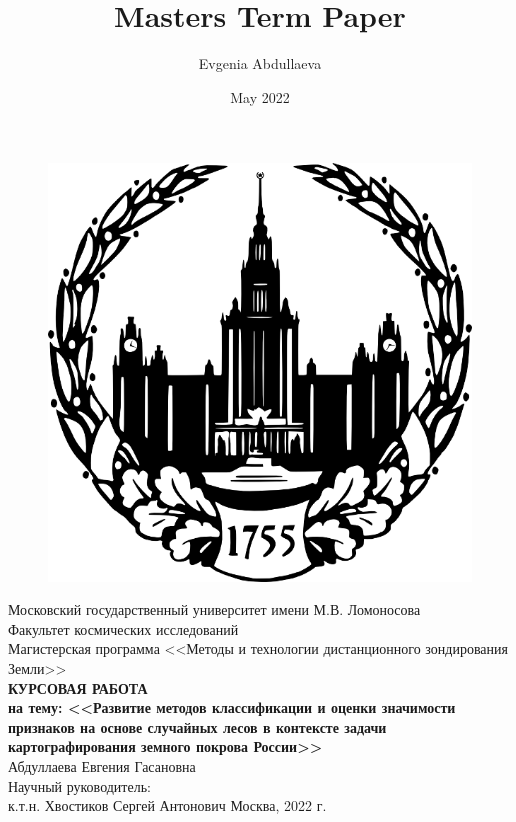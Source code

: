 \documentclass[14pt, a4paper, oneside]{extarticle}
\title{Masters Term Paper}
\author{Evgenia Abdullaeva}
\date{May 2022}
\begin{document}
\begin{titlepage}
    \centering
        \begin{figure}[H]
            \centering
            \includegraphics[scale=1.6]{msu-logo}
        \end{figure}
        Московский государственный университет имени М.В. Ломоносова\\
        \vspace{0.5cm}
        Факультет космических исследований\\
        Магистерская программа <<Методы и технологии дистанционного зондирования Земли>>\\
        \vfill
        \textbf{КУРСОВАЯ РАБОТА\\
        на тему: <<Развитие методов классификации и оценки значимости признаков на основе случайных лесов в контексте задачи картографирования земного покрова России>>}\\
        \vfill
        Абдуллаева Евгения Гасановна\\
        \vspace{0.5cm}
        Научный руководитель:\\
        к.т.н. Хвостиков Сергей Антонович
        \vfill
        Москва, 2022 г.
\end{titlepage}

\begin{abstract}
\end{abstract}
\begin{abstract}

\end{abstract}
\setcounter{page}{2}
\newpage
\end{document}
